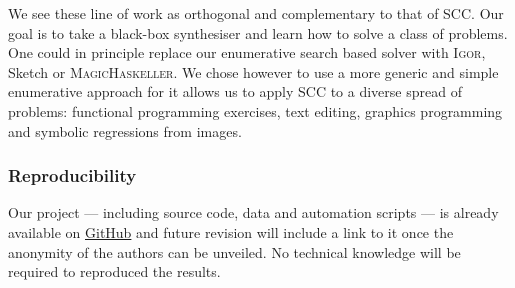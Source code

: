 \documentclass{article}
\begin{document}
We see these line of work as orthogonal and complementary to that of SCC\@. Our
goal is to take a black-box synthesiser and learn how to solve a class of
problems. One could in principle replace our enumerative search based solver
with \textsc{Igor}, Sketch or \textsc{MagicHaskeller}. We chose however to
use a more generic and simple enumerative approach for it allows us to apply SCC
to a diverse spread of problems: functional programming exercises, text editing,
graphics programming and symbolic regressions from images.


\subsubsection*{Reproducibility}

Our project --- including source code, data and automation scripts --- is
already available on \url{GitHub} and future revision will include a link to it
once the anonymity of the authors can be unveiled. No technical knowledge will
be required to reproduced the results.
\end{document}
